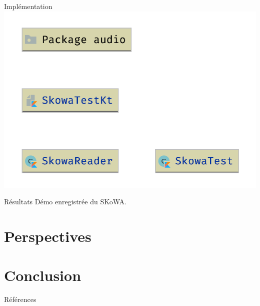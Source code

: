 \documentclass[aspectratio=169]{beamer}
\begin{document}
\begin{frame}{Implémentation}
  \centering
  \includegraphics[height=.9\textheight]{../assets/uml_skowa_reader}
\end{frame}

\begin{frame}{Résultats}
  Démo enregistrée du SKoWA.
\end{frame}

\section{Perspectives}

\section{Conclusion}


\begin{frame}{Références}
  \printbibliography
\end{frame}



\end{document}
